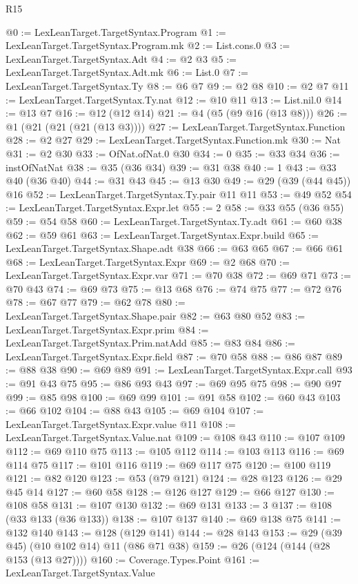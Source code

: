 \begin{lexlean}{R15}
\begin{coremodule}
@0 := LexLeanTarget.TargetSyntax.Program
@1 := LexLeanTarget.TargetSyntax.Program.mk
@2 := List.cons.{0}
@3 := LexLeanTarget.TargetSyntax.Adt
@4 := @2 @3
@5 := LexLeanTarget.TargetSyntax.Adt.mk
@6 := List.{0}
@7 := LexLeanTarget.TargetSyntax.Ty
@8 := @6 @7
@9 := @2 @8
@10 := @2 @7
@11 := LexLeanTarget.TargetSyntax.Ty.nat
@12 := @10 @11
@13 := List.nil.{0}
@14 := @13 @7
@16 := @12 (@12 @14)
@21 := @4 (@5 (@9 @16 (@13 @8)))
@26 := @1 (@21 (@21 (@21 (@13 @3))))
@27 := LexLeanTarget.TargetSyntax.Function
@28 := @2 @27
@29 := LexLeanTarget.TargetSyntax.Function.mk
@30 := Nat
@31 := @2 @30
@33 := OfNat.ofNat.{0} @30
@34 := 0
@35 := @33 @34
@36 := instOfNatNat
@38 := @35 (@36 @34)
@39 := @31 @38
@40 := 1
@43 := @33 @40 (@36 @40)
@44 := @31 @43
@45 := @13 @30
@49 := @29 (@39 (@44 @45)) @16
@52 := LexLeanTarget.TargetSyntax.Ty.pair @11 @11
@53 := @49 @52
@54 := LexLeanTarget.TargetSyntax.Expr.let
@55 := 2
@58 := @33 @55 (@36 @55)
@59 := @54 @58
@60 := LexLeanTarget.TargetSyntax.Ty.adt
@61 := @60 @38
@62 := @59 @61
@63 := LexLeanTarget.TargetSyntax.Expr.build
@65 := LexLeanTarget.TargetSyntax.Shape.adt @38
@66 := @63 @65
@67 := @66 @61
@68 := LexLeanTarget.TargetSyntax.Expr
@69 := @2 @68
@70 := LexLeanTarget.TargetSyntax.Expr.var
@71 := @70 @38
@72 := @69 @71
@73 := @70 @43
@74 := @69 @73
@75 := @13 @68
@76 := @74 @75
@77 := @72 @76
@78 := @67 @77
@79 := @62 @78
@80 := LexLeanTarget.TargetSyntax.Shape.pair
@82 := @63 @80 @52
@83 := LexLeanTarget.TargetSyntax.Expr.prim
@84 := LexLeanTarget.TargetSyntax.Prim.natAdd
@85 := @83 @84
@86 := LexLeanTarget.TargetSyntax.Expr.field
@87 := @70 @58
@88 := @86 @87
@89 := @88 @38
@90 := @69 @89
@91 := LexLeanTarget.TargetSyntax.Expr.call
@93 := @91 @43 @75
@95 := @86 @93 @43
@97 := @69 @95 @75
@98 := @90 @97
@99 := @85 @98
@100 := @69 @99
@101 := @91 @58
@102 := @60 @43
@103 := @66 @102
@104 := @88 @43
@105 := @69 @104
@107 := LexLeanTarget.TargetSyntax.Expr.value @11
@108 := LexLeanTarget.TargetSyntax.Value.nat
@109 := @108 @43
@110 := @107 @109
@112 := @69 @110 @75
@113 := @105 @112
@114 := @103 @113
@116 := @69 @114 @75
@117 := @101 @116
@119 := @69 @117 @75
@120 := @100 @119
@121 := @82 @120
@123 := @53 (@79 @121)
@124 := @28 @123
@126 := @29 @45 @14
@127 := @60 @58
@128 := @126 @127
@129 := @66 @127
@130 := @108 @58
@131 := @107 @130
@132 := @69 @131
@133 := 3
@137 := @108 (@33 @133 (@36 @133))
@138 := @107 @137
@140 := @69 @138 @75
@141 := @132 @140
@143 := @128 (@129 @141)
@144 := @28 @143
@153 := @29 (@39 @45) (@10 @102 @14) @11 (@86 @71 @38)
@159 := @26 (@124 (@144 (@28 @153 (@13 @27))))
@160 := Coverage.Types.Point
@161 := LexLeanTarget.TargetSyntax.Value

\end{coremodule}
\end{lexlean}
